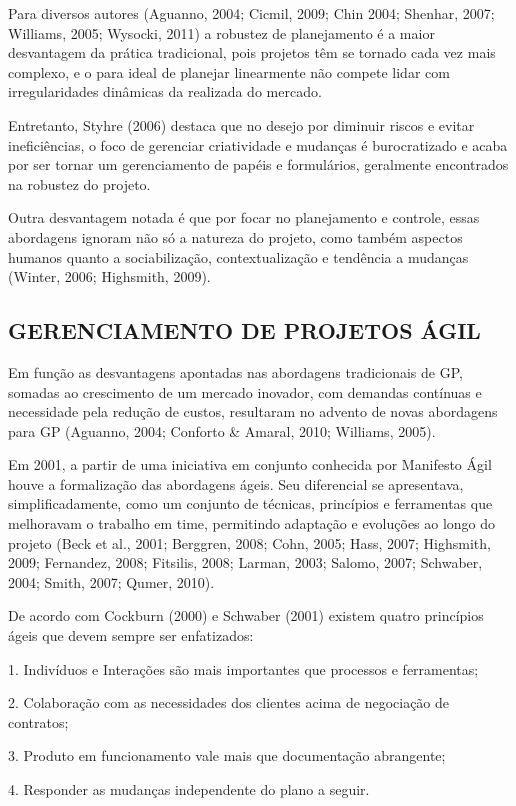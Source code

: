 Para diversos autores (Aguanno, 2004; Cicmil, 2009; Chin 2004; Shenhar, 2007; Williams, 2005; Wysocki, 2011) a robustez de planejamento é a maior desvantagem da prática tradicional, pois projetos têm se tornado cada vez mais complexo, e o para ideal de planejar linearmente não compete lidar com irregularidades dinâmicas da realizada do mercado.

Entretanto, Styhre (2006) destaca que no desejo por diminuir riscos e evitar ineficiências, o foco de gerenciar criatividade e mudanças é burocratizado e acaba por ser tornar um gerenciamento de papéis e formulários, geralmente encontrados na robustez do projeto.

Outra desvantagem notada é que por focar no planejamento e controle, essas abordagens ignoram não só a natureza do projeto, como também aspectos humanos quanto a sociabilização, contextualização e tendência a mudanças (Winter, 2006; Highsmith, 2009).

\subsection{GERENCIAMENTO DE PROJETOS ÁGIL}

Em função as desvantagens apontadas nas abordagens tradicionais de GP, somadas ao crescimento de um mercado inovador, com demandas contínuas e necessidade pela redução de custos, resultaram no advento de novas abordagens para GP (Aguanno, 2004; Conforto \& Amaral, 2010; Williams, 2005).

Em 2001, a partir de uma iniciativa em conjunto conhecida por Manifesto Ágil houve a formalização das abordagens ágeis. Seu diferencial se apresentava, simplificadamente, como um conjunto de técnicas, princípios e ferramentas que melhoravam o trabalho em time, permitindo adaptação e evoluções ao longo do projeto (Beck et al., 2001; Berggren, 2008; Cohn, 2005; Hass, 2007; Highsmith, 2009; Fernandez, 2008; Fitsilis, 2008; Larman, 2003; Salomo, 2007; Schwaber, 2004; Smith, 2007; Qumer, 2010).

De acordo com Cockburn (2000) e Schwaber (2001) existem quatro princípios ágeis que devem sempre ser enfatizados:

1. Indivíduos e Interações são mais importantes que processos e ferramentas;

2. Colaboração com as necessidades dos clientes acima de negociação de contratos;

3. Produto em funcionamento vale mais que documentação abrangente;

4. Responder as mudanças independente do plano a seguir.

